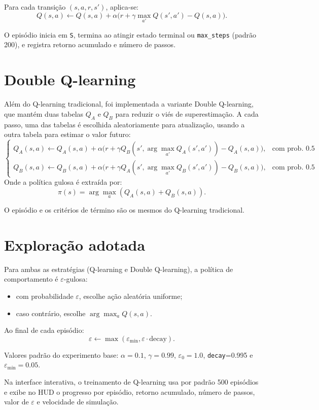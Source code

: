 \documentclass[a4paper,11pt]{article}
\begin{document}
Para cada transição $(s,a,r,s')$, aplica-se:
\[
Q(s,a)\leftarrow Q(s,a)+\alpha\Big(r+\gamma\max_{a'}Q(s',a')-Q(s,a)\Big).
\]

O episódio inicia em \texttt{S}, termina ao atingir estado terminal ou \texttt{max\_steps} (padrão 200), e registra retorno acumulado e número de passos.
\section{Double Q-learning}
Além do Q-learning tradicional, foi implementada a variante Double Q-learning, que mantém duas tabelas $Q_A$ e $Q_B$ para reduzir o viés de superestimação. A cada passo, uma das tabelas é escolhida aleatoriamente para atualização, usando a outra tabela para estimar o valor futuro:
\[
\begin{cases}
Q_A(s,a)\leftarrow Q_A(s,a)+\alpha\Big(r+\gamma Q_B(s',\arg\max_{a'}Q_A(s',a'))-Q_A(s,a)\Big), & \text{com prob. } 0.5 \\
Q_B(s,a)\leftarrow Q_B(s,a)+\alpha\Big(r+\gamma Q_A(s',\arg\max_{a'}Q_B(s',a'))-Q_B(s,a)\Big), & \text{com prob. } 0.5
\end{cases}
\]
Onde a política gulosa é extraída por:
\[
\pi(s)=\arg\max_a \left(Q_A(s,a)+Q_B(s,a)\right).
\]

O episódio e os critérios de término são os mesmos do Q-learning tradicional.

\section{Exploração adotada}

Para ambas as estratégias (Q-learning e Double Q-learning), a política de comportamento é $\varepsilon$-gulosa:
\begin{itemize}
    \item com probabilidade $\varepsilon$, escolhe ação aleatória uniforme;
    \item caso contrário, escolhe $\arg\max_a Q(s,a)$.
\end{itemize}

Ao final de cada episódio:
\[
\varepsilon\leftarrow\max(\varepsilon_{\min},\varepsilon\cdot \text{decay}).
\]

Valores padrão do experimento base: $\alpha=0.1$, $\gamma=0.99$, $\varepsilon_0=1.0$, \texttt{decay}=0.995 e $\varepsilon_{\min}=0.05$.

Na interface interativa, o treinamento de Q-learning usa por padrão 500 episódios e exibe no HUD o progresso por episódio, retorno acumulado, número de passos, valor de $\varepsilon$ e velocidade de simulação.
\end{document}
